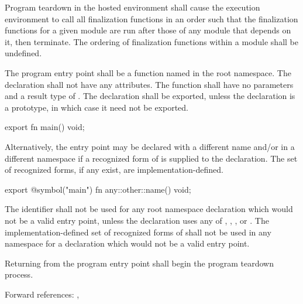 \specsubsubitem
Program teardown in the hosted environment shall cause the execution environment
to call all finalization functions in an order such that the finalization
functions for a given module are run after those of any module that depends on
it, then terminate. The ordering of finalization functions within a module shall
be undefined.

\specsubsubitem
The program entry point shall be a function named  in the root
namespace. The declaration shall not have any attributes. The function shall
have no parameters and a result type of . The declaration shall
be exported, unless the declaration is a prototype, in which case it need not be
exported.


\begin{codesample}
export fn main() void;
\end{codesample}


\specsubsubitem
Alternatively, the entry point may be declared with a different name and/or in a
different namespace if a recognized form of  is supplied to
the declaration. The set of recognized forms, if any exist, are
implementation-defined.


\begin{codesample}
export @symbol("main") fn any::other::name() void;
\end{codesample}

\specsubsubitem
The identifier  shall not be used for any root namespace declaration
which would not be a valid entry point, unless the declaration uses any of
, , , or .
The implementation-defined set of recognized forms of  shall
not be used in any namespace for a declaration which would not be a valid entry
point.

\specsubsubitem
Returning from the program entry point shall begin the program teardown process.

Forward references: , 


